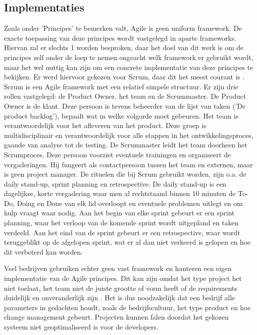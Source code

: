 \subsection{Implementaties}
Zoals onder 'Principes' te bemerken valt, Agile is geen uniform framework. De exacte toepassing van deze principes wordt vastgelegd in aparte frameworks. Hiervan zal er slechts 1 worden besproken, daar het doel van dit werk is om de principes zelf onder de loep te nemen ongeacht welk framework er gebruikt wordt, maar het wel nuttig kan zijn om een concrete implementatie van deze principes te bekijken.
Er werd hiervoor gekozen voor Scrum, daar dit het meest courant is \autocite{Sutherland2007}.
Scrum is een Agile framework met een relatief simpele structuur. Er zijn drie rollen vastgelegd: de Product Owner, het team en de Scrummaster. De Product Owner is de klant. Deze persoon is tevens beheerder van de lijst van taken ('De product backlog'), bepaalt wat in welke volgorde moet gebeuren. Het team is verantwoordelijk voor het afleveren van het product. Deze groep is multidisciplinair en verantwoordelijk voor alle stappen in het ontwikkelingsproces, gaande van analyse tot de testing. De Scrummaster leidt het team doorheen het Scrumproces. Deze persoon voorziet eventuele trainingen en organiseert de vergaderingen. Hij fungeert als contactpersoon tussen het team en externen, maar is geen project manager.
De rituelen die bij Scrum gebruikt worden, zijn o.a. de daily stand-up, sprint planning en retrospective. De daily stand-up is een dagelijkse, korte vergadering waar men al rechtstaand binnen 10 minuten de To-Do, Doing en Done van elk lid overloopt en eventuele problemen uitlegt en om hulp vraagt waar nodig. Aan het begin van elke sprint gebeurt er een sprint planning, waar het verloop van de komende sprint wordt uitgepland en taken verdeeld. Aan het eind van de sprint gebeurt er een retrospective, waar wordt teruggeblikt op de afgelopen sprint, wat er al dan niet verkeerd is gelopen en hoe dit verbeterd kan worden.


Veel bedrijven gebruiken echter geen vast framework en hanteren een eigen implementatie van de Agile principes. Dit kan zijn omdat het type project het niet toelaat, het team niet de juiste grootte of vorm heeft of de requirements duidelijk en onveranderlijk zijn \autocite{Naekki2011}. Het is dus noodzakelijk dat een bedrijf alle parameters in gedachten houdt, zoals de bedrijfscultuur, het type product en hoe change management gebeurt. Projecten kunnen falen doordat het gekozen systeem niet geoptimaliseerd is voor de developers.


